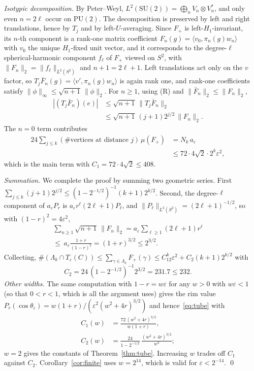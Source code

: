 \documentclass[aps,prx,twocolumn,superscriptaddress,nofootinbib,longbibliography]{revtex4-2}
\theoremstyle{plain}
\theoremstyle{definition}
\theoremstyle{remark}
\newcommand{\PU}{\mathrm{PU}(2)}
\newcommand{\SU}{\mathrm{SU}(2)}
\begin{document}
\emph{Isotypic decomposition.} By Peter--Weyl, $L^2(\SU)=\bigoplus_nV_n\otimes V_n^*$, and only even $n=2\ell$ occur on $\PU$. The decomposition is preserved by left and right translations, hence by $T_j$ and by left-$U$-averaging. Since $F_+$ is left-$H_1$-invariant, its $n$-th component is a rank-one matrix coefficient $F_n(g)=\langle v_0,\pi_n(g)w_n\rangle$ with $v_0$ the unique $H_1$-fixed unit vector, and it corresponds to the degree-$\ell$ spherical-harmonic component $f_\ell$ of $F_+$ viewed on $S^2$, with $\|F_n\|_2=\|f_\ell\|_{L^2(S^2)}$ and $n+1=2\ell+1$. Left translations act only on the $v$ factor, so $T_j\bar F_n(g)=\langle v',\pi_n(g)w_n\rangle$ is again rank one, and rank-one coefficients satisfy $\|\phi\|_\infty\le\sqrt{n+1}\,\|\phi\|_2$. For $n\ge1$, using (R) and $\|\bar F_n\|_2\le\|F_n\|_2$,
\begin{equation}
\begin{aligned}
|(T_j\bar F_n)(e)|&\le\sqrt{n+1}\,\|T_j\bar F_n\|_2\\
&\le\sqrt{n+1}\,(j+1)2^{j/2}\,\|F_n\|_2 .
\end{aligned}
\end{equation}
The $n=0$ term contributes
\[\begin{aligned}24\sum_{j\le k}(\#\text{vertices at distance }j)\,\mu(F_+)&=N_k\,a_\varepsilon\\&\le72\cdot4\sqrt2\cdot2^k\varepsilon^2,\end{aligned}\]
which is the main term with $C_1=72\cdot4\sqrt2\le408$.

\emph{Summation.} We complete the proof by summing two geometric series. First $\sum_{j\le k}(j+1)2^{j/2}\le(1-2^{-1/2})^{-1}(k+1)2^{k/2}$. Second, the degree-$\ell$ component of $a_\varepsilon P_r$ is $a_\varepsilon r^\ell(2\ell+1)P_\ell$, and $\|P_\ell\|_{L^2(S^2)}=(2\ell+1)^{-1/2}$, so with $(1-r)^2=4\varepsilon^2$,
\begin{multline}
\sum_{n\ge1}\sqrt{n+1}\,\|F_n\|_2=a_\varepsilon\!\sum_{\ell\ge1}(2\ell+1)r^\ell\\
\le\ a_\varepsilon\frac{1+r}{(1-r)^2}=(1+r)^{3/2}\le2^{3/2}.
\end{multline}
Collecting, $\#(\Lambda_k\cap T_\varepsilon(C))\le\sum_{\gamma\in\Lambda_k}F_+(\gamma)\le C_12^k\varepsilon^2+C_2(k+1)2^{k/2}$ with
\begin{equation}
C_2=24\,(1-2^{-1/2})^{-1}2^{3/2}=231.7\le232 .
\end{equation}
\emph{Other widths.} The same computation with $1-r=w\varepsilon$ for any $w>0$ with $w\varepsilon<1$ (so that $0<r<1$, which is all the argument uses) gives the rim value $P_r(\cos\theta_\varepsilon)=w(1+r)/(\varepsilon^2(w^2+4r)^{3/2})$ and hence~\eqref{eq:tube} with
\begin{equation}\label{eq:tubew}
\begin{aligned}
C_1(w)&=\frac{72\,(w^2+4r)^{3/2}}{w(1+r)},\\
C_2(w)&=\frac{24}{1-2^{-1/2}}\,\frac{(w^2+4r)^{3/2}}{w^3};
\end{aligned}
\end{equation}
$w=2$ gives the constants of Theorem~\ref{thm:tube}. Increasing $w$ trades off $C_1$ against $C_2$. Corollary~\ref{cor:finite} uses $w=2^{14}$, which is valid for $\varepsilon<2^{-14}$. \qed
\end{document}
